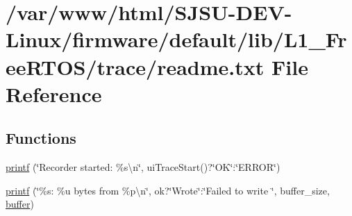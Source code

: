 \hypertarget{trace_2readme_8txt}{}\section{/var/www/html/\+S\+J\+S\+U-\/\+D\+E\+V-\/\+Linux/firmware/default/lib/\+L1\+\_\+\+Free\+R\+T\+O\+S/trace/readme.txt File Reference}
\label{trace_2readme_8txt}
\subsection*{Functions}
\begin{DoxyCompactItemize}
\item 
\hyperlink{trace_2readme_8txt_a44aa2eeca69a660d02109d54e99f2dc6}{printf} (\char`\"{}Recorder started\+: \%s\textbackslash{}n\char`\"{}, ui\+Trace\+Start()?\char`\"{}OK\char`\"{}\+:\char`\"{}E\+R\+R\+OR\char`\"{})
\item 
\hyperlink{trace_2readme_8txt_aab6d12e817533a453ac47609299f6779}{printf} (\char`\"{}\%s\+: \%u bytes from \%p\textbackslash{}n\char`\"{}, ok?\char`\"{}Wrote\char`\"{}\+:\char`\"{}Failed to write \char`\"{}, buffer\+\_\+size, \hyperlink{trace_2readme_8txt_a957c4a9f1964467acd0f88955116b588}{buffer})
\end{DoxyCompactItemize}
